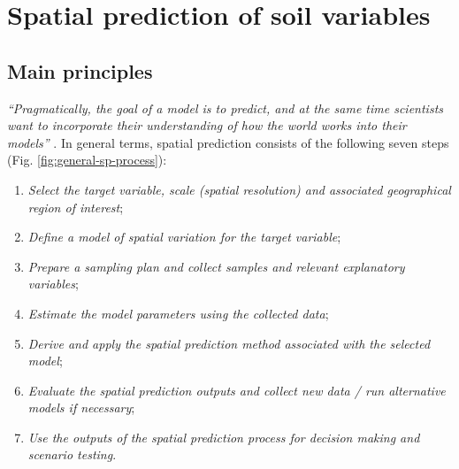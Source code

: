 \documentclass[11pt]{krantz}
\theoremstyle{definition}
\theoremstyle{definition}
\theoremstyle{definition}
\theoremstyle{remark}
\begin{document}
\hypertarget{spatial-prediction-of-soil-variables}{%
\section{Spatial prediction of soil
variables}\label{spatial-prediction-of-soil-variables}}

\hypertarget{main-principles}{%
\subsection{Main principles}\label{main-principles}}

\emph{``Pragmatically, the goal of a model is to predict, and at the
same time scientists want to incorporate their understanding of how the
world works into their models''} \citep{cressie2011statistics}. In
general terms, spatial prediction consists of the following seven steps
(Fig. \ref{fig:general-sp-process}):

\begin{enumerate}
\def\labelenumi{\arabic{enumi}.}
\item
  \emph{Select the target variable, scale (spatial resolution) and
  associated geographical region of interest};
\item
  \emph{Define a model of spatial variation for the target variable};
\item
  \emph{Prepare a sampling plan and collect samples and relevant
  explanatory variables};
\item
  \emph{Estimate the model parameters using the collected data};
\item
  \emph{Derive and apply the spatial prediction method associated with
  the selected model};
\item
  \emph{Evaluate the spatial prediction outputs and collect new data /
  run alternative models if necessary};
\item
  \emph{Use the outputs of the spatial prediction process for decision
  making and scenario testing}.
\end{enumerate}
\end{document}

